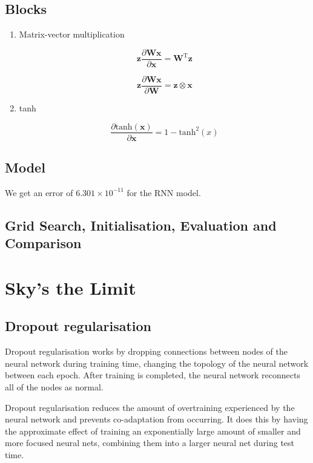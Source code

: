 \documentclass{article} %
\begin{document}
\subsection{Blocks}

\begin{enumerate}

\item Matrix-vector multiplication

\[\mathbf{z} \frac{\partial \mathbf{W} \mathbf{x}}{\partial \mathbf{x}}  = \mathbf{W}^{\text{T}} \mathbf{z}\]

\[\mathbf{z} \frac{\partial \mathbf{W} \mathbf{x}}{\partial \mathbf{W}}  = \mathbf{z} \otimes \mathbf{x}\]

\item tanh

\[ \frac{\partial \text{tanh}(\mathbf{x})}{\partial \mathbf{x}} = 1 - \text{tanh}^2(x) \]

\end{enumerate}

\subsection{Model}

We get an error of $6.301 \times 10^{-11}$ for the RNN model.

\subsection{Grid Search, Initialisation, Evaluation and Comparison}

\section{Sky's the Limit}

\subsection{Dropout regularisation}

Dropout regularisation works by dropping connections between nodes of the neural network during training time, changing the topology of the neural network between each epoch. After training is completed, the neural network reconnects all of the nodes as normal.

Dropout regularisation reduces the amount of overtraining experienced by the neural network and prevents co-adaptation  from occurring. It does this by having the approximate effect of training an exponentially large amount of smaller and more focused neural nets, combining them into a larger neural net during test time.
\end{document}
